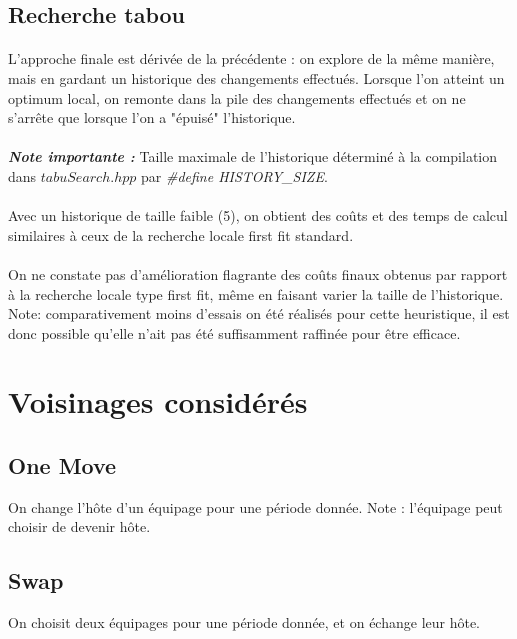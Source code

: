 \documentclass[a4paper,10pt]{report}
\begin{document}
\subsection{Recherche tabou}
\paragraph{}
L'approche finale est dérivée de la précédente : on explore de la même manière, mais en gardant un 
historique des changements effectués. Lorsque l'on atteint un optimum local, on remonte dans la pile
des changements effectués et on ne s'arrête que lorsque l'on a "épuisé" l'historique.

\paragraph{}
\textbf{\textit{Note importante :}} Taille maximale de l'historique déterminé à la compilation dans
$tabuSearch.hpp$ par \textit{\#define HISTORY\_SIZE}.

\paragraph{}
Avec un historique de taille faible (5), on obtient des coûts et des temps de calcul similaires à ceux
de la recherche locale first fit standard.

\paragraph{}
On ne constate pas d'amélioration flagrante des coûts finaux obtenus par rapport à la recherche locale
type first fit, même en faisant varier la taille de l'historique. Note: comparativement moins d'essais
on été réalisés pour cette heuristique, il est donc possible qu'elle n'ait pas été suffisamment
raffinée pour être efficace.



\section{Voisinages considérés}
\subsection{One Move}
On change l'hôte d'un équipage pour une période donnée. Note : l'équipage peut choisir de devenir hôte.

\subsection{Swap}
On choisit deux équipages pour une période donnée, et on échange leur hôte.
\end{document}
